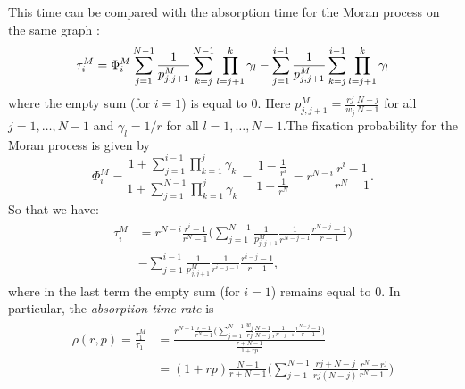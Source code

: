 \documentclass[a4paper,english,10pt]{amsart}
\theoremstyle{definition}
\numberwithin{equation}{section}
\begin{document}
This time can be compared with the absorption time for the Moran process
on  the same graph \cite{BHR, H}: 
\begin{equation} \label{eq:abs_Moran1}
  \tau^M_i  = \Phi^M_i \sum_{j=1}^{N-1}  \frac{1}{p^M_{j,j+1}} \sum_{k=j}^{N-1}\prod_{l=j+1}^{k} \gamma_l -\sum_{j=1}^{i-1}  \frac{1}{p^M_{j,j+1}} \sum_{k=j}^{i-1}\prod_{l=j+1}^{k} \gamma_l \\
\end{equation}
where the empty sum (for $i=1$) is equal to $0$. Here $p^M_{j,j+1} = \frac{rj}{w_j}\frac{N-j }{N-1}$ for all $j=1,\dots,N-1$ and $\gamma_l = 1/r$ for all $l=1,\dots,N-1$.The fixation probability for the Moran process is given by
\begin{equation} \label{eq:FP_Moran}
  \Phi_i ^M = \frac{1+\sum_{j=1}^{i-1}\prod_{k=1}^{j} \gamma_k}{1+\sum_{j=1}^{N-1}\prod_{k=1}^{j} \gamma_k} = \frac{\displaystyle 1 - \frac{1}{r^i}}{\displaystyle1 - \frac{1}{r^N}} = r^{N-i} \frac{\displaystyle r^i-1}{\displaystyle r^N-1} .
\end{equation}
So that we have: 
  \begin{align}   \label{eq:abs_Moran}
\begin{split}
    \tau^M_i  &
    =  r^{N-i} \frac{\displaystyle r^i-1}{\displaystyle r^N-1} 
    \Big( \sum_{j=1}^{N-1}  \frac{1}{p^M_{j,j+1}} 
    \frac{\displaystyle 1}{\displaystyle r^{N-j-1}} 
    \frac{\displaystyle r^{N-j} - 1}{\displaystyle r -1} \Big)  
     \\ 
    & - \sum_{j=1}^{i-1}  \frac{1}{p^M_{j,j+1}} \frac{\displaystyle 1}{\displaystyle r^{i-j-1}} \frac{\displaystyle r^{i-j} - 1}{\displaystyle r -1},  \end{split}
\end{align}
where in the last term the empty sum (for $i=1$) remains equal to $0$.
In particular, the \emph{absorption time rate} is
\begin{align} \label{eq:abs_rate}
\begin{split}
\rho(r,p) = \frac{\tau_1^M}{\tau_1~}
& =  \frac{\displaystyle r^{N-1}\frac{\displaystyle r-1}{\displaystyle r^N-1} 
\Big( \sum_{j=1}^{N-1}  \frac{w_j}{rj} \frac{N-1}{N-j} 
\frac{1}{r^{N-j-1}} 
\frac{r^{N-j} - 1}{r -1} \Big)}{\displaystyle \frac{r+N-1}{1+rp}}  \\
 & =  (1+rp)\frac{N-1}{r+N-1} 
\Big( \sum_{j=1}^{N-1}
\frac{rj+N-j}{rj(N-j)} \frac{r^N - r^j}{r^N-1\phantom{o}}  \Big)  \end{split}
\end{align}
\end{document}
